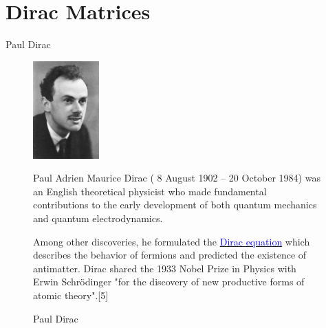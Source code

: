 \documentclass[handout,10pt]{beamer}
\begin{document}
\section{Dirac Matrices}


\begin{frame}[shrink=10]{Paul Dirac}
\begin{figure}[htb]

\begin{center}
\includegraphics[width=1.0in]{Dirac_4}
\end{center}

\caption{Paul Dirac}

Paul Adrien Maurice Dirac  ( 8 August 1902 -- 20 October 1984) was an English theoretical physicist who made fundamental contributions to the early development of both quantum mechanics and quantum electrodynamics. 

\pause

Among other discoveries, he formulated the \href{https://en.wikipedia.org/wiki/Dirac_equation}{\textcolor{blue}{Dirac equation}} which describes the behavior of fermions and predicted the existence of antimatter. Dirac shared the 1933 Nobel Prize in Physics with Erwin Schr\"odinger "for the discovery of new productive forms of atomic theory".[5] 
\end{figure}

\end{frame}
\end{document}
